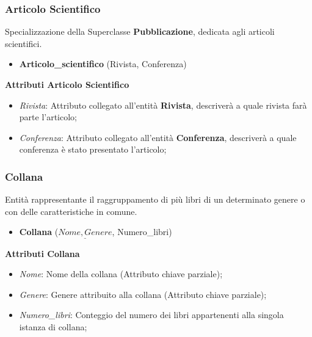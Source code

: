 \documentclass[a4paper, 15pt, oneside]{article}
\begin{document}
	\subsubsection{Articolo Scientifico}
	Specializzazione della Superclasse \textbf{Pubblicazione}, dedicata agli articoli scientifici.
	\begin{itemize}
		\item \textbf{Articolo\_scientifico} (Rivista, Conferenza)
	\end{itemize}
	\textbf{Attributi Articolo Scientifico}
	\begin{itemize}
		\item \textit{Rivista}: Attributo collegato all'entità \textbf{Rivista}, descriverà a quale rivista farà parte l'articolo;
		\item \textit{Conferenza}: Attributo collegato all'entità \textbf{Conferenza}, descriverà a quale conferenza è stato presentato l'articolo;
	\end{itemize}
	\subsubsection{Collana}
	Entità rappresentante il raggruppamento di più libri di un determinato genere o con delle caratteristiche in comune.
	\begin{itemize}
		\item \textbf{Collana} ($\underline{Nome, Genere}$, Numero\_libri)
	\end{itemize}
	\textbf{Attributi Collana}
	\begin{itemize}
		\item \textit{Nome}: Nome della collana (Attributo chiave parziale);
		\item \textit{Genere}: Genere attribuito alla collana (Attributo chiave parziale);
		\item \textit{Numero\_libri}: Conteggio del numero dei libri appartenenti alla singola istanza di collana;
	\end{itemize}
\end{document}
